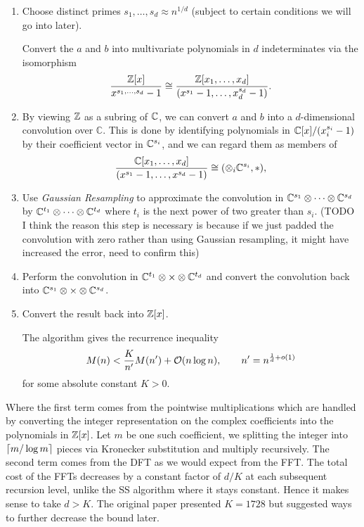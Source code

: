\begin{enumerate}
    \item  Choose distinct primes $s_1, \ldots, s_d \approx n^{1/d}$ (subject to certain conditions we will go into later). 

    Convert the $a$ and $b$ into multivariate polynomials in $d$ indeterminates via the isomorphism
        \[
            \frac{{\mathbb Z}[x]}{x^{s_1, \ldots, s_d} - 1} \cong \frac{{\mathbb Z}[x_1, \ldots, x_d]}{(x^{s_1} - 1, \ldots, x_d^{s_d} - 1)}.
        \]
    \item By viewing ${\mathbb Z}$ as a subring of ${\mathbb C}$, we can convert $a$ and $b$ into a $d$-dimensional convolution over $\mathbb{C}$.
        This is done by identifying polynomials in ${\mathbb C}[x]/(x_i^{s_i} - 1)$ by their coefficient vector in ${\mathbb C}^{s_i}$, and we can regard them as members of
        \[
            \frac{{\mathbb C}[x_1, \ldots, x_d]}{(x^{s_1} - 1, \ldots, x^{s_d} - 1)} \cong (\otimes_i {\mathbb C}^{s_i}, \ast),
        \]
    \item Use \emph{Gaussian Resampling} to approximate the convolution in ${\mathbb C}^{s_1} \otimes \cdots \otimes {\mathbb C}^{s_d}$ by ${\mathbb C}^{t_1} \otimes \cdots \otimes {\mathbb C}^{t_d}$ where $t_i$ is the next power of two greater than $s_i$. (TODO I think the reason this step is necessary is because if we just padded the convolution with zero rather than using Gaussian resampling, it might have increased the error, need to confirm this)
    \item Perform the convolution in ${\mathbb C}^{t_1} \otimes \times \otimes {\mathbb C}^{t_d}$ and convert the convolution back into ${\mathbb C}^{s_1} \otimes \times \otimes {\mathbb C}^{s_d}$.
    \item Convert the result back into ${\mathbb Z}[x]$.

        The algorithm gives the recurrence inequality
        \[
            M(n) < \frac{K}{n^\prime}M(n^\prime) + \mathcal O(n \log n), \qquad n^\prime = n^{\frac{1}{d} + o(1)}
        \]
        for some absolute constant $K > 0$.
\end{enumerate}

Where the first term comes from the pointwise multiplications which are handled by converting the integer representation on the complex coefficients into the polynomials in ${\mathbb Z}[x]$. Let $m$ be one such coefficient, we splitting the integer into $\left \lceil m / \log m \right \rceil$ pieces via Kronecker substitution and multiply recursively. The second term comes from the DFT as we would expect from the FFT. The total cost of the FFTs decreases by a constant factor of $d/K$ at each subsequent recursion level, unlike the SS algorithm where it stays constant. Hence it makes sense to take $d > K$. The original paper presented $K = 1728$ but suggested ways to further decrease the bound later.

